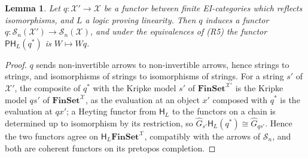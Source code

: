 \documentclass[11pt]{amsart}
\newtheorem{lem}[thm]{Lemma}
\theoremstyle{definition}
\newcommand{\Fin}{\mathbf{FinSet}}
\newcommand{\PP}{\mathsf P}
\newcommand{\HH}{\mathsf H}
\newcommand{\cX}{\mathcal X}
\newcommand{\cS}{\mathcal S}
\begin{document}
\begin{lem}\label{lem:trans}
Let $q\colon\cX'\to\cX$ be a functor between finite EI-categories
which reflects isomorphisms, and $L$ a logic proving linearity. Then
$q$ induces a functor $q\colon\cS_n(\cX')\to\cS_n(\cX)$, and under the
equivalences of \emph{(R5)} the functor $\PP\HH_L(q^*)$ is $W\mapsto
Wq$.
\end{lem}
\begin{proof}
$q$ sends non-invertible arrows to non-invertible arrows, hence
strings to strings, and isomorphisms of strings to isomorphisms of
strings. For a string $s'$ of $\cX'$, the composite of $q^*$ with the
Kripke model $s'$ of $\Fin^{\cX'}$ is the Kripke model $qs'$ of
$\Fin^\cX$, as the evaluation at an object $x'$ composed with $q^*$ is
the evaluation at $qx'$; a Heyting functor from $\HH_L$ to the functors
on a chain is determined up to isomorphism by its restriction, so
$\hat G_{s'}\HH_L(q^*)\cong\hat G_{qs'}$. Hence the two functors agree
on $\HH_L\Fin^\cX$, compatibly with the arrows of $\cS_n$, and both
are coherent functors on its pretopos completion.
\end{proof}
\end{document}
